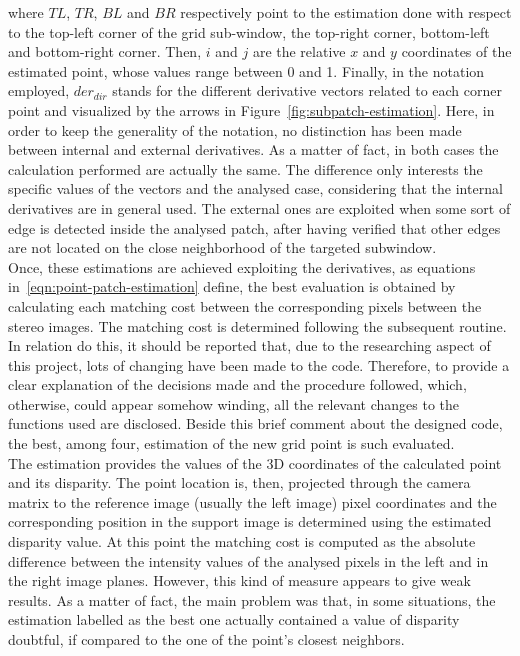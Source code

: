 where $TL$, $TR$, $BL$ and $BR$ respectively point to the estimation done with respect to the top-left corner of the grid sub-window, the top-right corner, bottom-left and bottom-right corner. 
Then, $i$ and $j$ are the relative $x$ and $y$ coordinates of the estimated point, whose values range between 0 and 1.
Finally, in the notation employed, $der_{dir}$ stands for the different derivative vectors related to each corner point and visualized by the arrows in Figure~\ref{fig:subpatch-estimation}.
Here, in order to keep the generality of the notation, no distinction has been made between internal and external derivatives.
As a matter of fact, in both cases the calculation performed are actually the same.
The difference only interests the specific values of the vectors and the analysed case, considering that the internal derivatives are in general used.
The external ones are exploited when some sort of edge is detected inside the analysed patch, after having verified that other edges are not located on the close neighborhood of the targeted subwindow. \\
Once, these estimations are achieved exploiting the derivatives, as equations in~\ref{eqn:point-patch-estimation} define, the best evaluation is obtained by calculating each matching cost between the corresponding pixels between the stereo images. 
The matching cost is determined following the subsequent routine.\\
In relation do this, it should be reported that, due to the researching aspect of this project, lots of changing have been made to the code.
Therefore, to provide a clear explanation of the decisions made and the procedure followed, which, otherwise, could appear somehow winding, all the relevant changes to the functions used are disclosed. 
Beside this brief comment about the designed code, the best, among four, estimation of the new grid point is such evaluated.\\
The estimation provides the values of the 3D coordinates of the calculated point and its disparity.
The point location is, then, projected through the camera matrix to the reference image (usually the left image) pixel coordinates and the corresponding position in the support image is determined using the estimated disparity value. 
At this point the matching cost is computed as the absolute difference between the intensity values of the analysed pixels in the left and in the right image planes. 
However, this kind of measure appears to give weak results. 
As a matter of fact, the main problem was that, in some situations, the estimation labelled as the best one actually contained a value of disparity doubtful, if compared to the one of the point's closest neighbors.  
